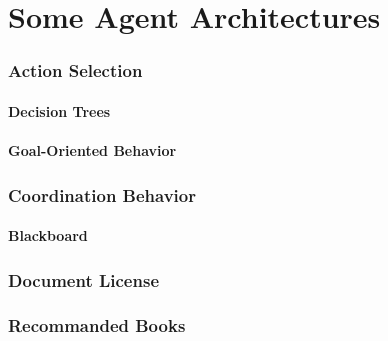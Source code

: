 \part{Some Agent Architectures}
\begin{bibliographysection}

	\section{Action Selection}
	\subsection{Decision Trees}
	\localized
	\subsection{Goal-Oriented Behavior}
	\localized

	\section{Coordination Behavior}
	\subsection{Blackboard}
	\localized

\end{bibliographysection}

\appendix
\section{Document License}
\localized
\section{Recommanded Books}
\localized

\endinput
